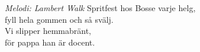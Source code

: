 {\footnotesize\textit{Melodi: Lambert Walk}}
\vspace{10pt}
Spritfest hos Bosse varje helg,\\
fyll hela gommen och så svälj.\\
Vi slipper hemmabränt,\\
för pappa han är docent.

